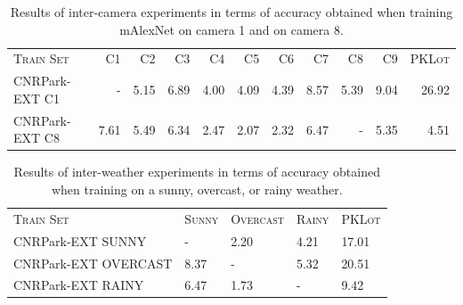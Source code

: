 \begin{table}
\begin{tabularx}{\linewidth}{Xrrrrrrrrrr}
\toprule
\textsc{Train Set} &   \textsc{C1} &   \textsc{C2} &   \textsc{C3} &   \textsc{C4} &   \textsc{C5} &   \textsc{C6} &   \textsc{C7} &   \textsc{C8} &   \textsc{C9} & \textsc{PKLot} \\
                   \cmidrule(lr){2-2} \cmidrule(lr){3-3} \cmidrule(lr){4-4} \cmidrule(lr){5-5} \cmidrule(lr){6-6} \cmidrule(lr){7-7} \cmidrule(lr){8-8} \cmidrule(lr){9-9} \cmidrule(lr){10-10} \cmidrule(lr){11-11}
CNRPark-EXT C1 &    - & 5.15 & 6.89 & 4.00 & 4.09 & 4.39 & 8.57 & 5.39 & 9.04 & 26.92 \\
CNRPark-EXT C8 & 7.61 & 5.49 & 6.34 & 2.47 & 2.07 & 2.32 & 6.47 &    - & 5.35 &  4.51 \\
\bottomrule
\end{tabularx}
\caption{Results of inter-camera experiments in terms of accuracy obtained when training mAlexNet on camera 1 and on camera 8.}
\label{tab:mini:inter-camera}
\end{table}

\begin{table}
\begin{tabularx}{\linewidth}{lRRRR}
\toprule
\textsc{Train Set} & \textsc{Sunny} & \textsc{Overcast} & \textsc{Rainy} & \textsc{PKLot} \\
                     \cmidrule(lr){2-2} \cmidrule(lr){3-3} \cmidrule(lr){4-4} \cmidrule(lr){5-5}
CNRPark-EXT SUNNY    &    - & 2.20  & 4.21 & 17.01 \\
CNRPark-EXT OVERCAST & 8.37 &    -  & 5.32 & 20.51 \\
CNRPark-EXT RAINY    & 6.47 & 1.73  &    - &  9.42 \\
\bottomrule
\end{tabularx}
\caption{Results of inter-weather experiments in terms of accuracy obtained when training on a sunny, overcast, or rainy weather.}
\label{tab:mini:inter-weather}
\end{table}

